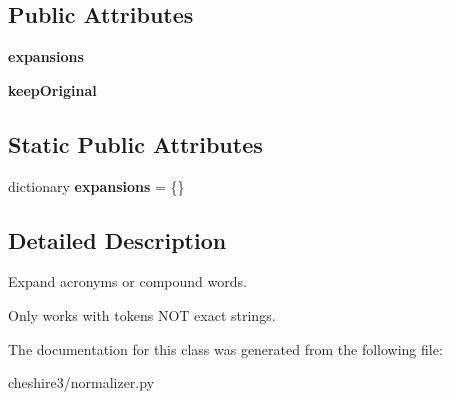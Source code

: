 \subsection*{Public Attributes}
\begin{DoxyCompactItemize}
\item 
\hypertarget{classcheshire3_1_1normalizer_1_1_token_expansion_normalizer_ad43b11cc6b1389b5ef63554392eb1ee6}{{\bfseries expansions}}\label{classcheshire3_1_1normalizer_1_1_token_expansion_normalizer_ad43b11cc6b1389b5ef63554392eb1ee6}

\item 
\hypertarget{classcheshire3_1_1normalizer_1_1_token_expansion_normalizer_a2f72ff212da0954da459698294da4112}{{\bfseries keep\-Original}}\label{classcheshire3_1_1normalizer_1_1_token_expansion_normalizer_a2f72ff212da0954da459698294da4112}

\end{DoxyCompactItemize}
\subsection*{Static Public Attributes}
\begin{DoxyCompactItemize}
\item 
\hypertarget{classcheshire3_1_1normalizer_1_1_token_expansion_normalizer_a230116391b198debdf4b0616020bb07b}{dictionary {\bfseries expansions} = \{\}}\label{classcheshire3_1_1normalizer_1_1_token_expansion_normalizer_a230116391b198debdf4b0616020bb07b}

\end{DoxyCompactItemize}


\subsection{Detailed Description}
\begin{DoxyVerb}Expand acronyms or compound words.

Only works with tokens NOT exact strings. 
\end{DoxyVerb}
 

The documentation for this class was generated from the following file\-:\begin{DoxyCompactItemize}
\item 
cheshire3/normalizer.\-py\end{DoxyCompactItemize}
